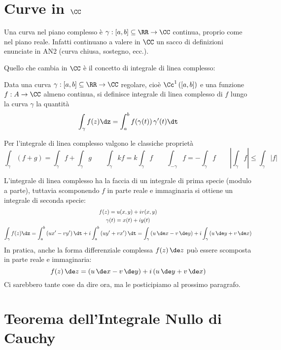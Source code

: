 \section{Curve in \texorpdfstring{$\CC$}{C}}

Una curva nel piano complesso è $\gamma: [a, b]\subseteq\RR\rightarrow \CC$ continua, proprio come nel piano reale. Infatti continuano a valere in $\CC$ un sacco di definizioni enunciate in AN2 (curva chiusa, sostegno, ecc.).

Quello che cambia in $\CC$ è il concetto di integrale di linea complesso:
\begin{defn}
Data una curva $\gamma: [a, b]\subseteq\RR\rightarrow \CC$ regolare, cioè $\Cc^1\left([a,b]\right)$ e una funzione $f:A\to\CC$ almeno continua, si definisce integrale di linea complesso di $f$ lungo la curva $\gamma$ la quantità
\begin{equation*}
\int_{\gamma} f(z) \dz = \int^{b}_{a} f(\gamma (t))\, \gamma'(t) \dt
\end{equation*}
\end{defn}

\begin{rem}
Per l'integrale di linea complesso valgono le classiche proprietà
$$
\int_\gamma  \left(f+g\right)=\int_\gamma f + \int_\gamma g \qquad \int_\gamma kf = k\int_\gamma f \qquad \int_{-\gamma}f=-\int_\gamma f\qquad \left| \int_\gamma f \right|\leq \int_\gamma |f|
$$
\end{rem}

L'integrale di linea complesso ha la faccia di un integrale di prima specie (modulo a parte), tuttavia scomponendo $f$ in parte reale e immaginaria si ottiene un integrale di seconda specie:
\begin{gather*}
f(z)=u(x,y)+iv(x,y) \\
\gamma(t)=x(t)+iy(t) \\ 
\int_\gamma f(z)\dz=\int_a^b \left(ux'-vy'\right)\dt+i\int_a^b\left(uy'+vx'\right) \dt = \int_\gamma\left(u\,\de x-v\,\de y\right) +i\int_\gamma\left(u\,\de y+v\,\de x\right)
\end{gather*}
In pratica, anche la forma differenziale complessa $f(z)\,\de z$ può essere scomposta in parte reale e immaginaria:
\begin{equation*}
f(z)\,\de z=\left(u\,\de x-v\,\de y\right)+i\left(u\,\de y+v\,\de x\right)
\end{equation*}
Ci sarebbero tante cose da dire ora, ma le posticipiamo al prossimo paragrafo. 


\section{Teorema dell'Integrale Nullo di Cauchy}

